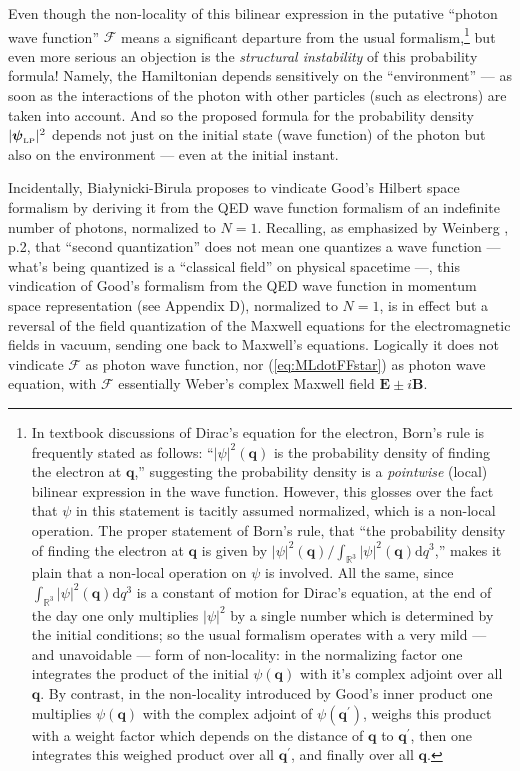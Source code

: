 \documentclass[11pt]{article}
\theoremstyle{definition}
\newcommand{\drm}{\mathrm{d}}
\newcommand{\refeq}[1]{(\ref{#1})}
\newcommand{\vect}[1] {\boldsymbol{{ #1}} }
\newcommand{\qV}{{\vect{q}}}            %
\newcommand{\FV}{\pmb{\mathcal{F}}}
\numberwithin{equation}{section}
\newcommand{\bB}{\mathbf{B}}
\newcommand{\bE}{\mathbf{E}}
\newcommand{\psiLP}{{{\boldsymbol{\psi}}_{\mbox{\rm\tiny LP}}}}
\newcommand{\Rset}{{\mathbb R}}
\begin{document}
 Even though the non-locality of this bilinear expression in the putative ``photon wave function'' $\FV$ means a 
significant departure from the usual formalism,\footnote{In textbook discussions of Dirac's equation for the electron, Born's rule is frequently 
stated as follows: ``$|\psi|^2(\qV)$ is  the probability density of finding the electron at $\qV$,'' suggesting the probability density 
is a \emph{pointwise} (local)  bilinear expression in the wave function.
 However, this glosses over the fact that $\psi$ in this statement is tacitly assumed normalized, which is a non-local operation.
 The proper statement of Born's rule, that ``the probability density of finding the electron at $\qV$ is given by 
 $|\psi|^2(\qV)/\int_{\Rset^3}|\psi|^2(\qV)\drm{q}^3$,'' makes it plain that a non-local operation on $\psi$ is involved.
 All the same, since $\int_{\Rset^3}|\psi|^2(\qV)\drm{q}^3$ is a constant of motion for Dirac's equation, at the end of the day
one only multiplies $|\psi|^2$ by a single number which is determined by the initial conditions; so the usual formalism operates with
a very mild --- and unavoidable --- form of non-locality: in the normalizing factor one integrates the product of the initial $\psi(\qV)$ 
with it's complex adjoint over all $\qV$. 
 By contrast, in the non-locality introduced by Good's inner product one multiplies $\psi(\qV)$ with the complex
adjoint of $\psi({\qV}^\prime)$, weighs this product with a weight factor which depends on the distance of $\qV$ to ${\qV}^\prime$, 
then one integrates this weighed product over all ${\qV}^\prime$, and finally over all $\qV$.\vspace{-10pt}}
but even more serious an objection is the \emph{structural instability} of this probability formula!
 Namely, the Hamiltonian depends sensitively on the ``environment'' --- as soon as the interactions of the photon 
with other particles (such as electrons) are taken into account. 
 And so the proposed formula for the probability density $|\psiLP|^2$ depends 
not just on the initial state (wave function) of the photon but also on the environment --- even at the initial instant.

 Incidentally, Bia\l{}ynicki-Birula proposes to vindicate Good's Hilbert space formalism by deriving it from the QED wave function 
formalism of an indefinite number of photons, normalized to $N=1$. 
 Recalling, as emphasized by Weinberg \cite{WeinbergTALK}, p.2, that ``second quantization'' does
not mean one quantizes a wave function --- what's being quantized is a ``classical field'' on physical spacetime ---, 
this vindication of Good's formalism from the QED wave function in momentum space representation (see Appendix D), 
normalized to $N=1$, is in effect but a reversal of the field quantization of the Maxwell equations for the electromagnetic fields in vacuum, 
sending one back to Maxwell's equations.
 Logically it does not vindicate $\FV$ as photon wave function, nor \refeq{eq:MLdotFFstar} as photon wave equation, with $\FV$ essentially
Weber's complex Maxwell field $\bE\pm i\bB$.
\end{document}
